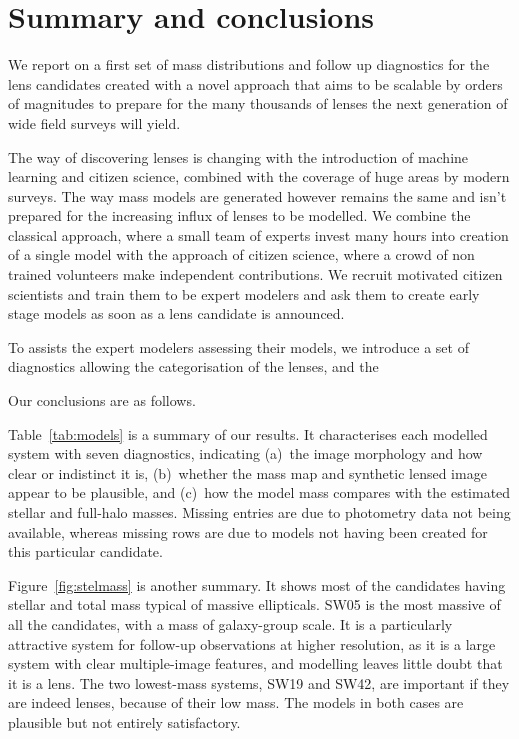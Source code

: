 \section{Summary and conclusions}\label{sec:summary}


We report on a first set of mass distributions and follow up diagnostics for the \SW lens candidates created with a novel approach that aims to be scalable by orders of magnitudes to prepare for the many thousands of lenses the next generation of wide field surveys will yield.

The way of discovering lenses is changing with the introduction of machine learning and citizen science, combined with the coverage of huge areas by modern surveys.
The way mass models are generated however remains the same and isn't prepared for the increasing influx of lenses to be modelled.
We combine the classical approach, where a small team of experts invest many hours into creation of a single model with the approach of citizen science, where a crowd of non trained volunteers make independent contributions.
We recruit motivated citizen scientists and train them to be expert modelers and ask them to create early stage models as soon as a lens candidate is announced.


To assists the expert modelers assessing their models, we introduce a set of diagnostics allowing the categorisation of the lenses, and the 




Our conclusions are as follows.

Table~\ref{tab:models} is a summary of our results.  It characterises
each modelled system with seven diagnostics, indicating (a)~the image
morphology and how clear or indistinct it is, (b)~whether the mass map
and synthetic lensed image appear to be plausible, and (c)~how the
model mass compares with the estimated stellar and full-halo masses.
Missing entries are due to photometry data not being available, whereas
missing rows are due to models not having been created for this particular
candidate.

Figure~\ref{fig:stelmass} is another summary.  It shows most of the
candidates having stellar and total mass typical of massive
ellipticals.  SW05 is the most massive of all the candidates, with a
mass of galaxy-group scale.  It is a particularly attractive system
for follow-up observations at higher resolution, as it is a large system
with clear multiple-image features, and modelling leaves little doubt
that it is a lens.  The two lowest-mass systems, SW19 and SW42, are
important if they are indeed lenses, because of their low mass.  The
models in both cases are plausible but not entirely satisfactory.

